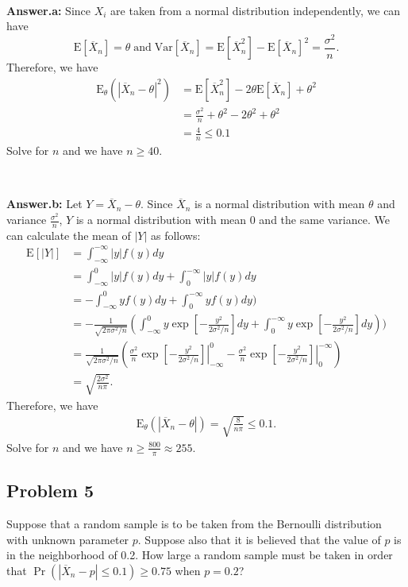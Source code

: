 \documentclass{article}
\begin{document}
\

\textbf{Answer.a:} Since $X_i$ are taken from a normal distribution independently, we can have
\begin{equation*}
\text{E}[\overline{X}_n] = \theta \; \text{and} \; \text{Var}[\overline{X}_n] = \text{E}[\overline{X}_n^2] - \text{E}[\overline{X}_n]^2 = \frac{\sigma^2}{n}.
\end{equation*}
Therefore, we have
\begin{align*}
\text{E}_{\theta}(|\overline{X}_n - \theta|^2) &= \text{E}[\overline{X}_n^2] - 2 \theta \text{E}[\overline{X}_n] + \theta^2 \\
&= \frac{\sigma^2}{n} + \theta^2 - 2\theta^2 + \theta^2 \\
&= \frac{4}{n} \le 0.1
\end{align*}
Solve for $n$ and we have $n \ge 40$.

\

\textbf{Answer.b:} Let $Y = \overline{X}_n - \theta$. Since $\overline{X}_n$ is a normal distribution with mean $\theta$ and variance $\frac{\sigma^2}{n}$, $Y$ is a normal distribution with mean 0 and the same variance. We can calculate the mean of $|Y|$ as follows:
\begin{align*}
\text{E}[|Y|] &= \int_{-\infty}^{-\infty} |y| f(y) dy \\
&= \int_{-\infty}^{0} |y| f(y) dy + \int_{0}^{-\infty} |y| f(y) dy \\
& = - \int_{-\infty}^{0} y f(y) dy + \int_{0}^{-\infty} y f(y) dy) \\
&= - \frac{1}{\sqrt{2\pi \sigma^2/n}} (\int_{-\infty}^{0} y \exp[-\frac{y^2}{2 \sigma^2/n}] dy + \int_{0}^{-\infty} y \exp[-\frac{y^2}{2 \sigma^2/n}] dy) )\\
&= \frac{1}{\sqrt{2\pi \sigma^2/n}} (\left. \frac{\sigma^2}{n} \exp[-\frac{y^2}{2 \sigma^2/n}] \right|_{-\infty}^{0} - \left. \frac{\sigma^2}{n} \exp[-\frac{y^2}{2 \sigma^2/n}] \right|_{0}^{-\infty})\\
&= \sqrt{\frac{2\sigma^2}{n\pi}}.
\end{align*}
Therefore, we have 
\begin{align*}
\text{E}_{\theta}(|\overline{X}_n - \theta|) = \sqrt{\frac{8}{n\pi}} \le 0.1.
\end{align*}
Solve for $n$ and we have $n \ge \frac{800}{\pi} \approx 255$.

\bigskip

\subsection*{Problem 5}
Suppose that a random sample is to be taken from the Bernoulli distribution with unknown parameter $p$. Suppose also that it is believed that the value of $p$ is in the neighborhood of 0.2. How large a random sample must be taken in order that $\Pr(|\overline{X}_n - p| \le 0.1) \ge 0.75$ when $p = 0.2$?
\end{document}

